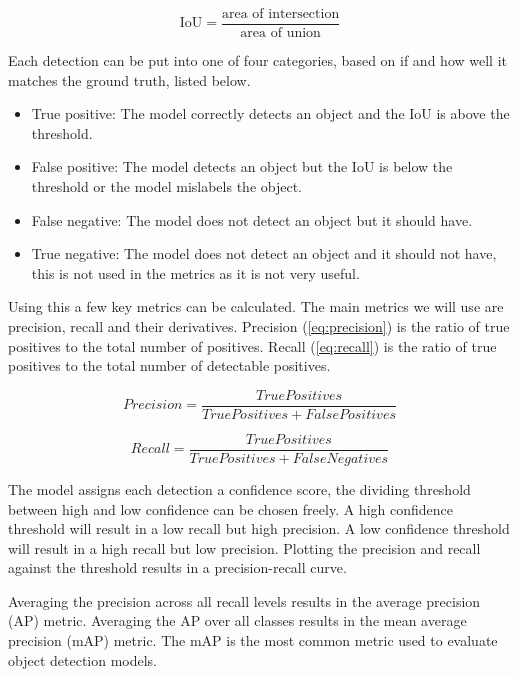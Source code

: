 \begin{equation}
	\text{IoU} = \frac{\text{area of intersection}}{\text{area of union}}
	\label{eq:IoU}
\end{equation}

Each detection can be put into one of four categories, based on if and how well it matches the ground truth, listed below.

\begin{itemize}
	\item True positive: The model correctly detects an object and the IoU is above the threshold.
	\item False positive: The model detects an object but the IoU is below the threshold or the model mislabels the object.
	\item False negative: The model does not detect an object but it should have.
	\item True negative: The model does not detect an object and it should not have, this is not used in the metrics as it is not very useful.
\end{itemize}

Using this a few key metrics can be calculated. The main metrics we will use are precision, recall and their derivatives. Precision (\ref{eq:precision}) is the ratio of true positives to the total number of positives. Recall (\ref{eq:recall}) is the ratio of true positives to the total number of detectable positives.



\begin{equation}
	Precision = \frac{TruePositives}{True Positives + False Positives}
	\label{eq:precision}
\end{equation}

\begin{equation}
	Recall = \frac{True Positives}{True Positives + False Negatives}
	\label{eq:recall}
\end{equation}

The model assigns each detection a confidence score, the dividing threshold between high and low confidence can be chosen freely. A high confidence threshold will result in a low recall but high precision. A low confidence threshold will result in a high recall but low precision. Plotting the precision and recall against the threshold results in a precision-recall curve.

Averaging the precision across all recall levels results in the average precision (AP) metric. Averaging the AP over all classes results in the mean average precision (mAP) metric. The mAP is the most common metric used to evaluate object detection models.

